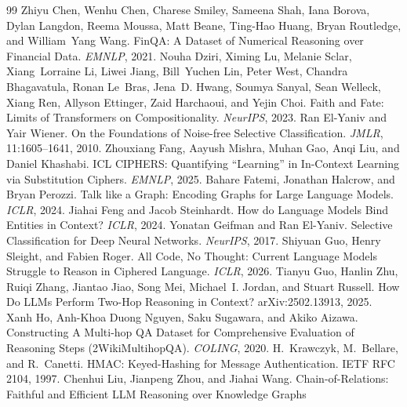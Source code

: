 \documentclass{article}
\begin{document}
\FloatBarrier
\begin{thebibliography}{99}
Zhiyu Chen, Wenhu Chen, Charese Smiley, Sameena Shah, Iana Borova, Dylan Langdon,
Reema Moussa, Matt Beane, Ting-Hao Huang, Bryan Routledge, and William~Yang Wang.
FinQA: A Dataset of Numerical Reasoning over Financial Data.
\emph{EMNLP}, 2021.
Nouha Dziri, Ximing Lu, Melanie Sclar, Xiang~Lorraine Li, Liwei Jiang,
Bill~Yuchen Lin, Peter West, Chandra Bhagavatula, Ronan Le~Bras,
Jena~D. Hwang, Soumya Sanyal, Sean Welleck, Xiang Ren, Allyson Ettinger,
Zaid Harchaoui, and Yejin Choi.
Faith and Fate: Limits of Transformers on Compositionality.
\emph{NeurIPS}, 2023.
Ran El-Yaniv and Yair Wiener.
On the Foundations of Noise-free Selective Classification.
\emph{JMLR}, 11:1605--1641, 2010.
Zhouxiang Fang, Aayush Mishra, Muhan Gao, Anqi Liu, and Daniel Khashabi.
ICL CIPHERS: Quantifying ``Learning'' in In-Context Learning via Substitution
Ciphers. \emph{EMNLP}, 2025.
Bahare Fatemi, Jonathan Halcrow, and Bryan Perozzi.
Talk like a Graph: Encoding Graphs for Large Language Models.
\emph{ICLR}, 2024.
Jiahai Feng and Jacob Steinhardt.
How do Language Models Bind Entities in Context?
\emph{ICLR}, 2024.
Yonatan Geifman and Ran El-Yaniv.
Selective Classification for Deep Neural Networks.
\emph{NeurIPS}, 2017.
Shiyuan Guo, Henry Sleight, and Fabien Roger.
All Code, No Thought: Current Language Models Struggle to Reason in Ciphered
Language. \emph{ICLR}, 2026.
Tianyu Guo, Hanlin Zhu, Ruiqi Zhang, Jiantao Jiao, Song Mei, Michael~I. Jordan,
and Stuart Russell.
How Do LLMs Perform Two-Hop Reasoning in Context?
arXiv:2502.13913, 2025.
Xanh Ho, Anh-Khoa Duong Nguyen, Saku Sugawara, and Akiko Aizawa.
Constructing A Multi-hop QA Dataset for Comprehensive Evaluation of
Reasoning Steps (2WikiMultihopQA). \emph{COLING}, 2020.
H.~Krawczyk, M.~Bellare, and R.~Canetti.
{HMAC}: Keyed-Hashing for Message Authentication.
{IETF RFC} 2104, 1997.
Chenhui Liu, Jianpeng Zhou, and Jiahai Wang.
Chain-of-Relations: Faithful and Efficient LLM Reasoning over Knowledge Graphs

\end{thebibliography}
\end{document}
